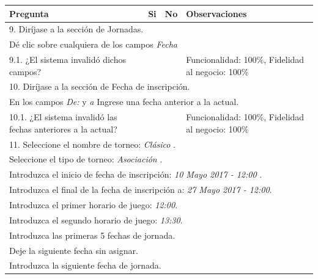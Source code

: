 \documentclass[oneside,10pt]{book}
\begin{document}
\begin{tabularx}{\textwidth}{ X l l X }
\hline
\multicolumn{1}{|X|}{Pregunta}                               & \multicolumn{1}{l|}{Si} & \multicolumn{1}{l|}{No} & \multicolumn{1}{X|}{Observaciones} \\ \hline

\multicolumn{4}{|l|}{9. Diríjase a la sección de Jornadas.  }              \\ \hline
\multicolumn{4}{|l|}{Dé clic sobre cualquiera de los campos \textit{Fecha}} \\ \hline
\multicolumn{1}{|X|}{9.1. ¿El sistema invalidó dichos campos?} & \multicolumn{1}{l|}{}   & \multicolumn{1}{l|}{}   & \multicolumn{1}{X|}{Funcionalidad: 100\%, Fidelidad al negocio: 100\%}              \\ \hline

\multicolumn{4}{|l|}{10. Diríjase a la sección de Fecha de inscripción.  }              \\ \hline
\multicolumn{4}{|l|}{En los campos \textit{De:} y \textit{a} Ingrese una fecha anterior a la actual.} \\ \hline
\multicolumn{1}{|X|}{10.1. ¿El sistema invalidó las fechas anteriores a la actual?} & \multicolumn{1}{l|}{}   & \multicolumn{1}{l|}{}   & \multicolumn{1}{X|}{Funcionalidad: 100\%, Fidelidad al negocio: 100\%}              \\ \hline

\multicolumn{4}{|l|}{11. Seleccione el nombre de torneo: \textit{Clásico }.}      \\
\multicolumn{4}{|l|}{Seleccione el tipo de torneo: \textit{Asociación }.}      \\
\multicolumn{4}{|l|}{Introduzca el inicio de fecha de inscripción: \textit{10 Mayo 2017 - 12:00 }.}         \\
\multicolumn{4}{|l|}{Introduzca el final de la fecha de inscripción a: \textit{27 Mayo 2017 - 12:00}.}       \\
\multicolumn{4}{|l|}{Introduzca el primer horario de juego: \textit{12:00}.}              \\
\multicolumn{4}{|l|}{Introduzca el segundo horario de juego: \textit{13:30}.}              \\
\multicolumn{4}{|l|}{Introduzca las primeras 5 fechas de jornada.}             \\
\multicolumn{4}{|l|}{Deje la siguiente fecha sin asignar.}             \\
\multicolumn{4}{|l|}{Introduzca la siguiente  fecha de jornada.} \\ \hline


\end{tabularx}
\end{document}
